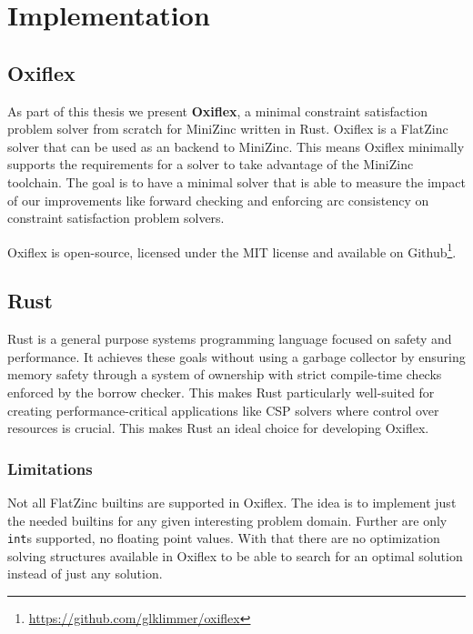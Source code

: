 \chapter{Implementation} \label{chap:impl}


\section{Oxiflex}

As part of this thesis we present \textbf{Oxiflex}, a minimal constraint satisfaction problem solver from scratch for MiniZinc written in Rust. Oxiflex is a FlatZinc solver that can be used as an backend to MiniZinc. This means Oxiflex minimally supports the requirements for a solver to take advantage of the MiniZinc toolchain. The goal is to have a minimal solver that is able to measure the impact of our improvements like forward checking and enforcing arc consistency on constraint satisfaction problem solvers.

Oxiflex is open-source, licensed under the MIT license and available on Github\footnote{\url{https://github.com/glklimmer/oxiflex}}.

\section{Rust}

Rust \cite{rust:2014} is a general purpose systems programming language focused on safety and performance. It achieves these goals without using a garbage collector by ensuring memory safety through a system of ownership with strict compile-time checks enforced by the borrow checker. This makes Rust particularly well-suited for creating performance-critical applications like CSP solvers where control over resources is crucial. This makes Rust an ideal choice for developing Oxiflex.

\subsection{Limitations}

Not all FlatZinc builtins are supported in Oxiflex. The idea is to implement just the needed builtins for any given interesting problem domain. Further are only \verb|int|s supported, no floating point values. With that there are no optimization solving structures available in Oxiflex to be able to search for an optimal solution instead of just any solution.

